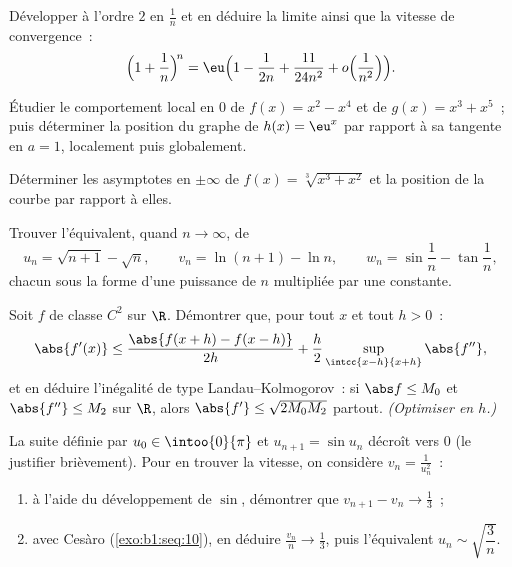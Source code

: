 \begin{exercise}[$\star\star$]\label{exo:b1:taylor:5}
Développer à l'ordre $2$ en $\frac1n$ et en déduire la limite ainsi
que la vitesse de convergence~:
\[
\Bigl(1 + \frac 1n\Bigr)^{\!n}
= \eu\Bigl(1 - \frac{1}{2n} + \frac{11}{24n^2} +
o\Bigl(\frac{1}{n^2}\Bigr)\Bigr).
\]
\end{exercise}

\begin{exercise}[$\star\star$]\label{exo:b1:taylor:6}
Étudier le comportement local en $0$ de $f(x) = x^2 - x^4$ et de $g(x)
= x^3 + x^5$~; puis déterminer la position du graphe de $h(x) = \eu^x$
par rapport à sa tangente en $a = 1$, localement puis globalement.
\end{exercise}

\begin{exercise}[$\star\star$]\label{exo:b1:taylor:7}
Déterminer les asymptotes en $\pm\infty$ de $f(x) =
\sqrt[3]{x^3 + x^2}$ et la position de la courbe par rapport à
elles.
\end{exercise}

\begin{exercise}[$\star\star$]\label{exo:b1:taylor:8}
Trouver l'équivalent, quand $n \to \infty$, de
\[
u_n = \sqrt{n+1} - \sqrt n, \qquad
v_n = \ln(n+1) - \ln n, \qquad
w_n = \sin\frac{1}{n} - \tan\frac{1}{n},
\]
chacun sous la forme d'une puissance de $n$ multipliée par une
constante.
\end{exercise}

\begin{exercise}[$\star\star\star$]\label{exo:b1:taylor:9}
Soit $f$ de classe $C^2$ sur $\R$. Démontrer que, pour tout $x$ et tout
$h > 0$~:
\[
\abs{f'(x)} \leq \frac{\abs{f(x+h) - f(x-h)}}{2h} +
\frac{h}{2}\sup_{\intcc{x-h}{x+h}}\abs{f''} ,
\]
et en déduire l'inégalité de type Landau--Kolmogorov~: si $\abs f \leq
M_0$ et $\abs{f''} \leq M_2$ sur $\R$, alors $\abs{f'} \leq
\sqrt{2 M_0 M_2}$ partout. \emph{(Optimiser en $h$.)}
\end{exercise}

\begin{exercise}[$\star\star\star$]\label{exo:b1:taylor:10}
La suite définie par $u_0 \in \intoo{0}{\pi}$ et $u_{n+1} = \sin u_n$
décroît vers $0$ (le justifier brièvement). Pour en trouver la
vitesse, on considère $v_n = \frac{1}{u_n^2}$~:
\begin{enumerate}
  \item à l'aide du développement de $\sin$, démontrer que $v_{n+1} -
        v_n \to \frac13$~;
  \item avec Cesàro (\cref{exo:b1:seq:10}), en déduire $\frac{v_n}{n}
        \to \frac13$, puis l'équivalent $u_n \sim
        \sqrt{\dfrac{3}{n}}$.
\end{enumerate}
\end{exercise}

